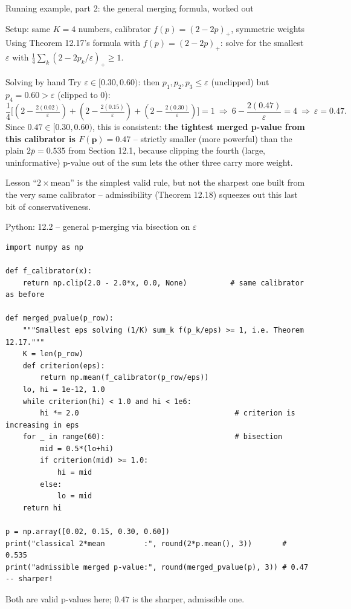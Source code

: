 \documentclass[aspectratio=169,10pt]{beamer}
\newcommand{\bp}{\mathbf{p}}
\begin{document}
\begin{frame}{Running example, part 2: the general merging formula, worked out}
  \begin{block}{Setup: same $K=4$ numbers, calibrator $f(p)=(2-2p)_+$, symmetric weights}
    Using Theorem 12.17's formula with $f(p)=(2-2p)_+$: solve for the smallest $\varepsilon$ with $\tfrac14\sum_k(2-2p_k/\varepsilon)_+\ge1$.
  \end{block}
  \begin{block}{Solving by hand}
    Try $\varepsilon\in[0.30,0.60)$: then $p_1,p_2,p_3\le\varepsilon$ (unclipped) but $p_4=0.60>\varepsilon$ (clipped to $0$):
    \[
      \frac14\Big[(2-\tfrac{2(0.02)}\varepsilon)+(2-\tfrac{2(0.15)}\varepsilon)+(2-\tfrac{2(0.30)}\varepsilon)\Big]=1
      \ \Longrightarrow\ 6-\frac{2(0.47)}\varepsilon=4 \ \Longrightarrow\ \varepsilon=0.47.
    \]
    Since $0.47\in[0.30,0.60)$, this is consistent: \textbf{the tightest merged p-value from this calibrator is $F(\bp)=0.47$} -- strictly smaller (more powerful) than the plain $2\bar p=0.535$ from Section 12.1, because clipping the fourth (large, uninformative) p-value out of the sum lets the other three carry more weight.
  \end{block}
  \begin{block}{Lesson}
    ``$2\times$mean'' is the simplest valid rule, but not the sharpest one built from the very same calibrator -- admissibility (Theorem 12.18) squeezes out this last bit of conservativeness.
  \end{block}
\end{frame}

\begin{frame}[fragile]{Python: 12.2 -- general p-merging via bisection on $\varepsilon$}
  \begin{lstlisting}
import numpy as np

def f_calibrator(x):
    return np.clip(2.0 - 2.0*x, 0.0, None)          # same calibrator as before

def merged_pvalue(p_row):
    """Smallest eps solving (1/K) sum_k f(p_k/eps) >= 1, i.e. Theorem 12.17."""
    K = len(p_row)
    def criterion(eps):
        return np.mean(f_calibrator(p_row/eps))
    lo, hi = 1e-12, 1.0
    while criterion(hi) < 1.0 and hi < 1e6:
        hi *= 2.0                                    # criterion is increasing in eps
    for _ in range(60):                              # bisection
        mid = 0.5*(lo+hi)
        if criterion(mid) >= 1.0:
            hi = mid
        else:
            lo = mid
    return hi

p = np.array([0.02, 0.15, 0.30, 0.60])
print("classical 2*mean         :", round(2*p.mean(), 3))       # 0.535
print("admissible merged p-value:", round(merged_pvalue(p), 3)) # 0.47  -- sharper!
  \end{lstlisting}
  \small Both are valid p-values here; $0.47$ is the sharper, admissible one.
\end{frame}
\end{document}

